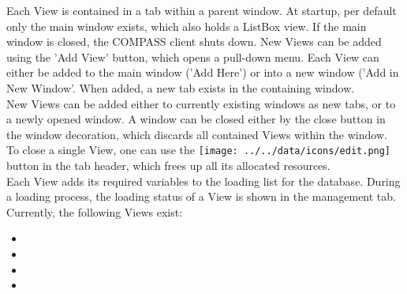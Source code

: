 Each View is contained in a tab within a parent window.  At startup, per default only the main window exists, which also holds
a ListBox view. If the main window is closed, the COMPASS client shuts down. New Views can be added using the 'Add View' button, which opens a pull-down menu. Each View can either be added to the main window ('Add Here') or into a new window ('Add in New Window'. When added, a new tab exists in the containing window. \\

New Views can be added either to currently existing windows as new tabs, or to a newly opened window. A window can be closed either by the close button in the window decoration, which discards all contained Views within the window.  \\

To close a single View, one can use the \texttt{[image: ../../data/icons/edit.png]} button in the tab header, which frees up all its allocated resources. \\

Each View adds its required variables to the loading list for the database. During a loading process, the loading status  of a View is shown in the management tab.\\

Currently, the following Views exist:
\begin{itemize}
 \item {}
 \item {}
 \item {}
 \item {}
\end{itemize}

